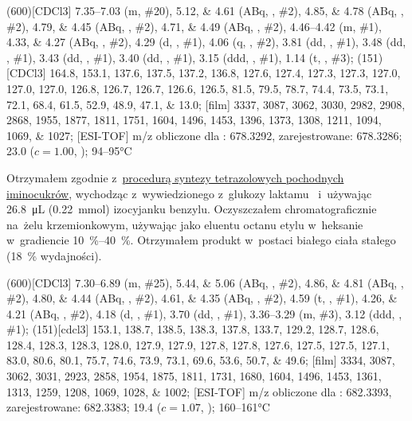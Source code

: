 \begin{fullexp}
  \NMR(600)[CDCl3] \numrange{7.35}{7.03} (m, \#{20}), \numlist{5.12;4.61} (ABq, , \#{2}), \numlist{4.85;4.78} (ABq, , \#{2}), \numlist{4.79;4.45} (ABq, , \#{2}), \numlist{4.71;4.49} (ABq, , \#{2}), \numrange{4.46}{4.42} (m, \#{1}), \numlist{4.33;4.27} (ABq, , \#{2}), \num{4.29} (d, , \#{1}), \num{4.06} (q, , \#{2}), \num{3.81} (dd, , \#{1}), \num{3.48} (dd, , \#{1}), \num{3.43} (dd, , \#{1}), \num{3.40} (dd, , \#{1}), \num{3.15} (ddd, , \#{1}), \num{1.14} (t, , \#{3});
  (151)[CDCl3] \numlist{164.8; 153.1; 137.6; 137.5; 137.2; 136.8; 127.6; 127.4; 127.3; 127.3; 127.0; 127.0; 127.0; 126.8; 126.7; 126.7; 126.6; 126.5; 81.5; 79.5; 78.7; 74.4; 73.5; 73.1; 72.1; 68.4; 61.5; 52.9; 48.9; 47.1; 13.0};
  [film] \numlist{3337; 3087; 3062; 3030; 2982; 2908; 2868; 1955; 1877; 1811; 1751; 1604; 1496; 1453; 1396; 1373; 1308; 1211; 1094; 1069; 1027};
  [ESI-TOF] m/z obliczone dla : \num{678.3292}, zarejestrowane: \num{678.3286};
  \data{[$\alpha^{23}_D$]~$=$} \num{23.0} ($c = 1.00$, );
   \numrange{94}{95}\si{\celsius}
\end{fullexp}

Otrzymałem zgodnie z~\hyperref[experimental:sugars:schwartz]{procedurą syntezy tetrazolowych
  pochodnych iminocukrów}, wychodząc z~wywiedzionego z~glukozy laktamu~
  i~używając \SI{26.8}{\micro\liter} (\SI{0.22}{\milli\mol}) izocyjanku benzylu.
Oczyszczałem chromatograficznie na~żelu krzemionkowym,
  używając jako eluentu octanu etylu w~heksanie w~gradiencie \SIrange{10}{40}{\percent}.
Otrzymałem produkt w~postaci białego ciała stałego (\SI{18}{\percent} wydajności).

\begin{fullexp}
  \NMR(600)[CDCl3] \numrange{7.30}{6.89} (m, \#{25}), \numlist{5.44;5.06} (ABq, , \#{2}), \numlist{4.86;4.81} (ABq, , \#{2}), \numlist{4.80;4.44} (ABq, , \#{2}), \numlist{4.61;4.35} (ABq, , \#{2}), \num{4.59} (t, , \#{1}), \numlist{4.26;4.21} (ABq, , \#{2}), \num{4.18} (d, , \#{1}), \num{3.70} (dd, , \#{1}), \numrange{3.36}{3.29} (m, \#{3}), \num{3.12} (ddd, , \#{1});
  (151)[cdcl3] \numlist{153.1; 138.7; 138.5; 138.3; 137.8; 133.7; 129.2; 128.7; 128.6; 128.4; 128.3; 128.3; 128.0; 127.9; 127.9; 127.8; 127.8; 127.6; 127.5; 127.5; 127.1; 83.0; 80.6; 80.1; 75.7; 74.6; 73.9; 73.1; 69.6; 53.6; 50.7; 49.6};
  [film] \numlist{3334; 3087; 3062; 3031; 2923; 2858; 1954; 1875; 1811; 1731; 1680; 1604; 1496; 1453; 1361; 1313; 1259; 1208; 1069; 1028; 1002};
  [ESI-TOF] m/z obliczone dla : \num{682.3393}, zarejestrowane: \num{682.3383};
  \data{[$\alpha^{23}_D$]~$=$} \num{19.4} ($c = 1.07$, );
   \numrange{160}{161}\si{\celsius}
\end{fullexp}

